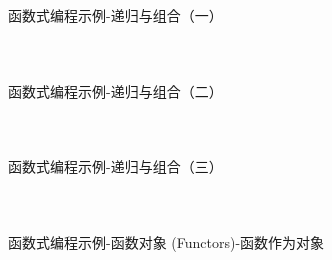 \documentclass[UTF8,aspectratio=169]{beamer}
\begin{document}
\begin{frame}[fragile]{函数式编程示例-递归与组合（一）}
    \begin{columns}
        \begin{column}{0.48\textwidth}
            \inputminted[firstline=1,lastline=17]{cpp}{code/functional_programming_4.cpp}
        \end{column}
        \begin{column}{0.48\textwidth}
            \inputminted[firstline=18,lastline=33]{cpp}{code/functional_programming_4.cpp}
        \end{column}
    \end{columns}
\end{frame}

\begin{frame}[fragile]{函数式编程示例-递归与组合（二）}
    \begin{columns}
        \begin{column}{0.48\textwidth}
            \inputminted[firstline=35,lastline=50]{cpp}{code/functional_programming_4.cpp}
        \end{column}
        \begin{column}{0.48\textwidth}
            \inputminted[firstline=51,lastline=63]{cpp}{code/functional_programming_4.cpp}
        \end{column}
    \end{columns}
\end{frame}

\begin{frame}[fragile]{函数式编程示例-递归与组合（三）}
    \begin{columns}
        \begin{column}{0.48\textwidth}
            \inputminted[firstline=1,lastline=16]{cpp}{code/functional_programming_7.cpp}
        \end{column}
        \begin{column}{0.48\textwidth}
            \inputminted[firstline=18,lastline=36]{cpp}{code/functional_programming_7.cpp}
        \end{column}
    \end{columns}
\end{frame}

\begin{frame}[fragile]{函数式编程示例-函数对象 (Functors)-函数作为对象}
    \begin{columns}
        \begin{column}{0.48\textwidth}
            \inputminted[firstline=1,lastline=17]{cpp}{code/functional_programming_5.cpp}
        \end{column}
        \begin{column}{0.48\textwidth}
            \inputminted[firstline=19,lastline=38]{cpp}{code/functional_programming_5.cpp}
        \end{column}
    \end{columns}
\end{frame}
\end{document}
